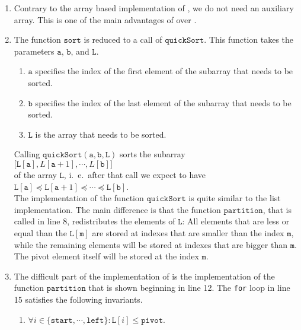 \begin{enumerate}
\item Contrary to the array based implementation of , we do not need an auxiliary
      array.  This is one of the main advantages of  over .
\item The function $\mathtt{sort}$ is reduced to a call of $\mathtt{quickSort}$.  This function
      takes the parameters $\mathtt{a}$, $\mathtt{b}$, and $\mathtt{L}$.  
      \begin{enumerate}
      \item $\mathtt{a}$ specifies the index of the first element of the subarray that needs to be
            sorted.
      \item $\mathtt{b}$ specifies the index of the last element of the subarray that needs to be
            sorted. 
      \item $\mathtt{L}$ is the array that needs to be sorted.
      \end{enumerate}
      Calling $\mathtt{quickSort}(\mathtt{a}, \mathtt{b}, \mathtt{L})$ sorts the subarray \\[0.2cm]
      \hspace*{1.3cm} 
      $\bigl[\mathtt{L}[\mathtt{a}], L[\mathtt{a}+1], \cdots, L[\mathtt{b}]\bigr]$
      \\[0.2cm]
      of the array $\mathtt{L}$, i.~e.~after that call we expect to have\\[0.2cm]
      \hspace*{1.3cm} 
      $\mathtt{L}[\mathtt{a}] \preceq \mathtt{L}[\mathtt{a}+1] \preceq \cdots \preceq \mathtt{L}[\mathtt{b}]$.
      \\[0.2cm]
      The implementation of the function $\mathtt{quickSort}$
      is quite similar to the list implementation.  The main difference is that the function
      $\mathtt{partition}$, that is called in line 8, redistributes the elements of $\mathtt{L}$:
      All elements that are less or equal than the  $\mathtt{L[m]}$
      are stored at indexes that are smaller than the index $\mathtt{m}$, while the remaining elements will 
      be stored at indexes that are bigger than $\mathtt{m}$.  The pivot element itself will be stored at the
      index $\mathtt{m}$. 
\item The difficult part of the implementation of  is the implementation of the
      function $\mathtt{partition}$ that is shown beginning in line 12.
      The \texttt{for} loop in line 15 satisfies the following invariants.
      \begin{enumerate}
      \item $\forall i \in \{ \mathtt{start}, \cdots, \mathtt{left} \} : \mathtt{L}[i] \leq \mathtt{pivot}$.


\end{enumerate}
\end{enumerate}
